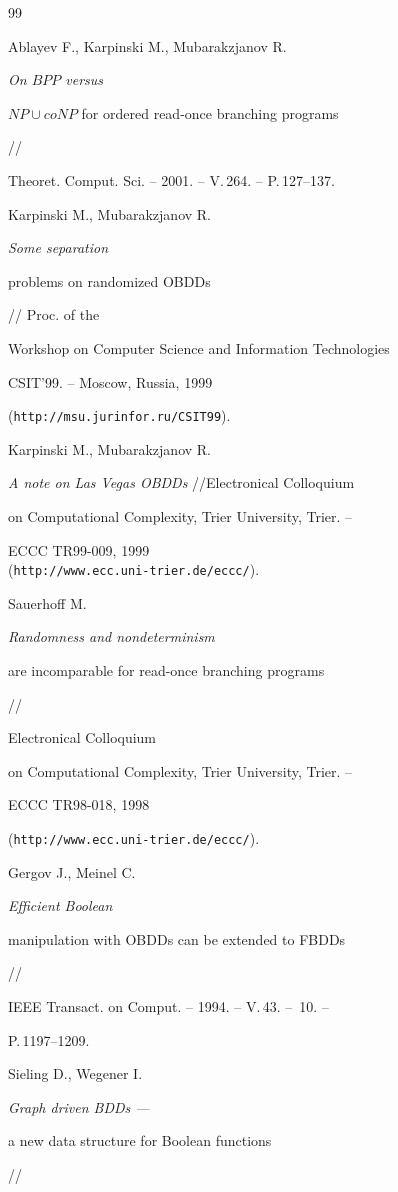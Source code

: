 \begin{thebibliography}{99}


Ablayev F., Karpinski M., Mubarakzjanov R.


{\em On $BPP$ versus


$NP \cup coNP$ for ordered read-once branching programs} //


Theoret. Comput. Sci. -- 2001. -- V.\,264. -- P.\,127--137.




Karpinski M., Mubarakzjanov R.


{\em Some separation


problems on randomized OBDDs} // Proc. of the


Workshop on Computer Science and Information Technologies


CSIT'99. -- Moscow, Russia, 1999


({\tt http://msu.jurinfor.ru/CSIT99}).




Karpinski M., Mubarakzjanov R.


{\em A note on Las Vegas OBDDs} //Electronical Colloquium


on Computational Complexity, Trier University, Trier. --


ECCC TR99-009, 1999 \\


({\tt http://www.ecc.uni-trier.de/eccc/}).




Sauerhoff M. {\em Randomness and nondeterminism


are incomparable for read-once branching programs} //


Electronical Colloquium


on Computational Complexity, Trier University, Trier. --


ECCC TR98-018, 1998


({\tt http://www.ecc.uni-trier.de/eccc/}).




Gergov J., Meinel C. {\em Efficient Boolean


manipulation with OBDDs can be extended to FBDDs} //


IEEE Transact. on Comput. -- 1994. -- V.\,43. -- \No\,10. --


P.\,1197--1209.




Sieling D., Wegener I. {\em Graph driven BDDs ---


a new data structure for Boolean functions} //



\end{thebibliography}
